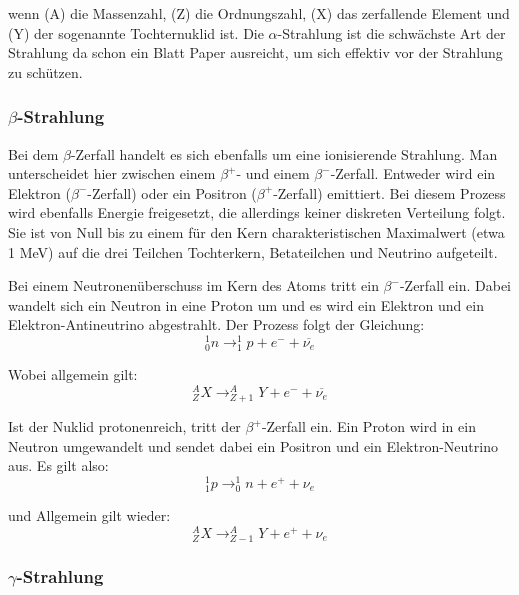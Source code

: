 wenn (A) die Massenzahl, (Z) die Ordnungszahl, (X) das zerfallende Element und (Y) der sogenannte Tochternuklid ist. Die $\alpha$-Strahlung ist die schwächste Art der Strahlung da schon ein Blatt Paper ausreicht, um sich effektiv vor der Strahlung zu schützen.

\subsubsection{$\beta$-Strahlung}
Bei dem $\beta$-Zerfall handelt es sich ebenfalls um eine ionisierende Strahlung. Man unterscheidet hier zwischen einem $\beta^{+}$- und einem $\beta^{-}$-Zerfall. Entweder wird ein Elektron ($\beta^{-}$-Zerfall) oder ein Positron ($\beta^{+}$-Zerfall) emittiert. Bei diesem Prozess wird ebenfalls Energie freigesetzt, die allerdings keiner diskreten Verteilung folgt. Sie ist von Null bis zu einem für den Kern charakteristischen Maximalwert (etwa 1 MeV) auf die drei Teilchen Tochterkern, Betateilchen und Neutrino aufgeteilt.

Bei einem Neutronenüberschuss im Kern des Atoms tritt ein $\beta^{-}$-Zerfall ein. Dabei wandelt sich ein Neutron in eine Proton um und es wird ein Elektron und ein Elektron-Antineutrino abgestrahlt. Der Prozess folgt der Gleichung:
\begin{equation}
^{1}_{0}n \rightarrow ^{1}_{1}p + e^{-} + \overline{\nu_{e}}
\end{equation}

Wobei allgemein gilt:
\begin{equation}
^{A}_{Z}X \rightarrow ^{A}_{Z+1}Y + e^{-} + \overline{\nu_{e}}
\end{equation}

Ist der Nuklid protonenreich, tritt der $\beta^{+}$-Zerfall ein. Ein Proton wird in ein Neutron umgewandelt und sendet dabei ein Positron und ein Elektron-Neutrino aus. Es gilt also:
\begin{equation}
^{1}_{1}p \rightarrow ^{1}_{0}n + e^{+} + \nu_{e}
\end{equation}

und Allgemein gilt wieder:
\begin{equation}
^{A}_{Z}X \rightarrow ^{A}_{Z-1}Y + e^{+} + \nu_{e}
\end{equation}

\subsubsection*{$\gamma$-Strahlung}


